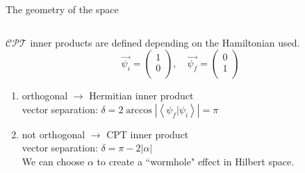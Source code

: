 \documentclass[10pt]{beamer}
\begin{document}
\begin{frame}{The geometry of the space}
\begin{columns}
    \hspace{1.5em}
    \begin{column}{\textwidth}
    $\mathcal{CPT}$ inner products are defined depending on the Hamiltonian used.\\
    \pause
    \vspace{0.5cm}
    \begin{equation*}
        \vec{\psi_i} = \begin{pmatrix}
                1 \\
                0 \\                
        \end{pmatrix}, \quad
        \vec{\psi_f} = \begin{pmatrix}
                0 \\
                1 \\                
        \end{pmatrix}
        \end{equation*}
    \begin{enumerate}
        \item orthogonal $\to$ \textcolor{myNewColorA}{Hermitian} inner product\\
        \pause
        \pause
        vector separation: $\delta = 2 \arccos{|\left< \psi_{f}| \psi_{i}\right>|} = \pi$\\
        \pause 
        \item not orthogonal $\to$ \textcolor{myNewColorC}{CPT}  inner  product\\
        \pause
        vector separation: $\delta = \pi - 2|\alpha|$\\
        \pause 
        \vspace{0.5cm}
        We can choose $\alpha$ to create a ``wormhole" effect in Hilbert space.
        \end{enumerate}
    \end{column}
\end{columns}
\end{frame}

\end{document}
